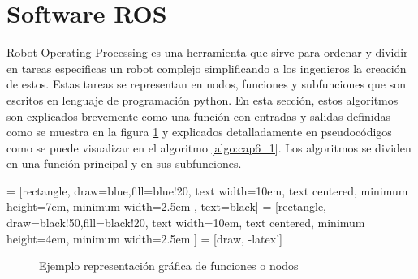      \newpage


\section{Software ROS}

    Robot Operating Processing es una herramienta que sirve para ordenar y dividir en tareas especificas un robot complejo simplificando a los ingenieros la creación de estos. Estas tareas se representan en nodos, funciones y subfunciones que son escritos en lenguaje de programación python. En esta sección, estos algoritmos son explicados brevemente como una función con entradas y salidas definidas como se muestra en la figura \ref{f:Cap6_funtion_1} y explicados detalladamente en pseudocódigos como se puede visualizar en el algoritmo \ref{algo:cap6_1}. Los algoritmos se dividen en una función principal y en sus subfunciones.
    
         = [rectangle, draw=blue,fill=blue!20, text width=10em, text centered, minimum height=7em, minimum width=2.5em , text=black]
         = [rectangle, draw=black!50,fill=black!20, text width=10em, text centered, minimum height=4em, minimum width=2.5em ]
         = [draw, -latex']
         \begin{center}
         \begin{figure}[htb]
                \caption{Ejemplo representación gráfica de funciones o nodos}
                \label{f:Cap6_funtion_1}
         \end{figure}
         \end{center}

